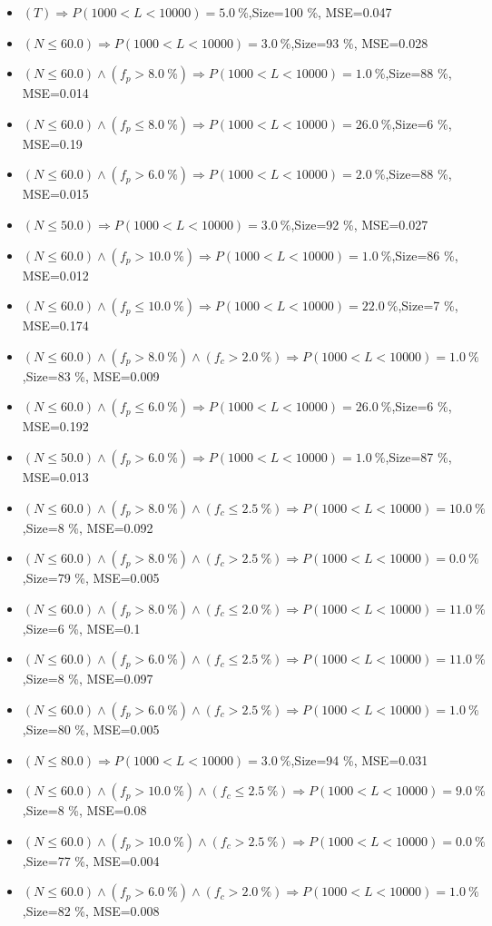 \documentclass[numbered]{CSL}
\begin{document}
\begin{itemize}
\item $(T) \Rightarrow P(1 000 < L < 10 000) = 5.0~\%$,\hfill Size=100 \%, MSE=0.047
\item $(N \leq 60.0) \Rightarrow P(1 000 < L < 10 000) = 3.0~\%$,\hfill Size=93 \%, MSE=0.028
\item $(N \leq 60.0) \land (f_p > 8.0~\%) \Rightarrow P(1 000 < L < 10 000) = 1.0~\%$,\hfill Size=88 \%, MSE=0.014
\item $(N \leq 60.0) \land (f_p \leq 8.0~\%) \Rightarrow P(1 000 < L < 10 000) = 26.0~\%$,\hfill Size=6 \%, MSE=0.19
\item $(N \leq 60.0) \land (f_p > 6.0~\%) \Rightarrow P(1 000 < L < 10 000) = 2.0~\%$,\hfill Size=88 \%, MSE=0.015
\item $(N \leq 50.0) \Rightarrow P(1 000 < L < 10 000) = 3.0~\%$,\hfill Size=92 \%, MSE=0.027
\item $(N \leq 60.0) \land (f_p > 10.0~\%) \Rightarrow P(1 000 < L < 10 000) = 1.0~\%$,\hfill Size=86 \%, MSE=0.012
\item $(N \leq 60.0) \land (f_p \leq 10.0~\%) \Rightarrow P(1 000 < L < 10 000) = 22.0~\%$,\hfill Size=7 \%, MSE=0.174
\item $(N \leq 60.0) \land (f_p > 8.0~\%) \land (f_c > 2.0~\%) \Rightarrow P(1 000 < L < 10 000) = 1.0~\%$,\hfill Size=83 \%, MSE=0.009
\item $(N \leq 60.0) \land (f_p \leq 6.0~\%) \Rightarrow P(1 000 < L < 10 000) = 26.0~\%$,\hfill Size=6 \%, MSE=0.192
\item $(N \leq 50.0) \land (f_p > 6.0~\%) \Rightarrow P(1 000 < L < 10 000) = 1.0~\%$,\hfill Size=87 \%, MSE=0.013
\item $(N \leq 60.0) \land (f_p > 8.0~\%) \land (f_c \leq 2.5~\%) \Rightarrow P(1 000 < L < 10 000) = 10.0~\%$,\hfill Size=8 \%, MSE=0.092
\item $(N \leq 60.0) \land (f_p > 8.0~\%) \land (f_c > 2.5~\%) \Rightarrow P(1 000 < L < 10 000) = 0.0~\%$,\hfill Size=79 \%, MSE=0.005
\item $(N \leq 60.0) \land (f_p > 8.0~\%) \land (f_c \leq 2.0~\%) \Rightarrow P(1 000 < L < 10 000) = 11.0~\%$,\hfill Size=6 \%, MSE=0.1
\item $(N \leq 60.0) \land (f_p > 6.0~\%) \land (f_c \leq 2.5~\%) \Rightarrow P(1 000 < L < 10 000) = 11.0~\%$,\hfill Size=8 \%, MSE=0.097
\item $(N \leq 60.0) \land (f_p > 6.0~\%) \land (f_c > 2.5~\%) \Rightarrow P(1 000 < L < 10 000) = 1.0~\%$,\hfill Size=80 \%, MSE=0.005
\item $(N \leq 80.0) \Rightarrow P(1 000 < L < 10 000) = 3.0~\%$,\hfill Size=94 \%, MSE=0.031
\item $(N \leq 60.0) \land (f_p > 10.0~\%) \land (f_c \leq 2.5~\%) \Rightarrow P(1 000 < L < 10 000) = 9.0~\%$,\hfill Size=8 \%, MSE=0.08
\item $(N \leq 60.0) \land (f_p > 10.0~\%) \land (f_c > 2.5~\%) \Rightarrow P(1 000 < L < 10 000) = 0.0~\%$,\hfill Size=77 \%, MSE=0.004
\item $(N \leq 60.0) \land (f_p > 6.0~\%) \land (f_c > 2.0~\%) \Rightarrow P(1 000 < L < 10 000) = 1.0~\%$,\hfill Size=82 \%, MSE=0.008
\end{itemize}
\end{document}
